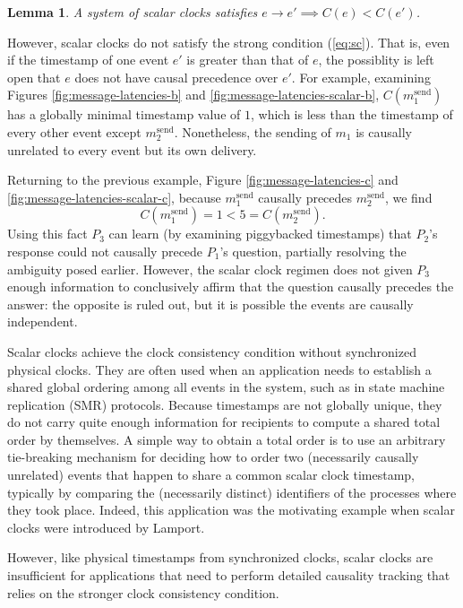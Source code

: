 \documentclass[]             %
{NASA}                       %
\newtheorem{lemma}[theorem]{Lemma}
\theoremstyle{definition}
\begin{document}
\begin{lemma}
  A system of scalar clocks satisfies $e \to e' \implies C(e) < C(e')$.
\end{lemma}

However, scalar clocks do not satisfy the strong condition
(\ref{eq:sc}). That is, even if the timestamp of one event $e'$ is
greater than that of $e$, the possiblity is left open that $e$ does
not have causal precedence over $e'$. For example, examining Figures
\ref{fig:message-latencies-b} and
\ref{fig:message-latencies-scalar-b}, $C(m_1^\textrm{send})$ has a
globally minimal timestamp value of $1$, which is less than the
timestamp of every other event except
$m_2^\textrm{send}$. Nonetheless, the sending of $m_1$ is causally
unrelated to every event but its own delivery.

Returning to the previous example, Figure \ref{fig:message-latencies-c} and
\ref{fig:message-latencies-scalar-c}, because $m_1^\textrm{send}$
causally precedes $m_2^\textrm{send}$, we find
\[C(m_1^\textrm{send}) = 1 < 5 = C(m_2^\textrm{send}).\] Using this
fact $P_3$ can learn (by examining piggybacked timestamps) that
$P_2$'s response could not causally precede $P_1$'s question,
partially resolving the ambiguity posed earlier. However, the scalar
clock regimen does not given $P_3$ enough information to conclusively
affirm that the question causally precedes the answer: the opposite is
ruled out, but it is possible the events are causally independent.

Scalar clocks achieve the clock consistency condition without
synchronized physical clocks. They are often used when an application
needs to establish a shared global ordering among all events in the
system, such as in state machine replication (SMR) protocols. Because
timestamps are not globally unique, they do not carry quite enough
information for recipients to compute a shared total order by
themselves. A simple way to obtain a total order is to use an
arbitrary tie-breaking mechanism for deciding how to order two
(necessarily causally unrelated) events that happen to share a common
scalar clock timestamp, typically by comparing the (necessarily
distinct) identifiers of the processes where they took place. Indeed,
this application was the motivating example when scalar clocks were
introduced by Lamport.

However, like physical timestamps from synchronized clocks, scalar
clocks are insufficient for applications that need to perform detailed
causality tracking that relies on the stronger clock consistency
condition.
\end{document}
